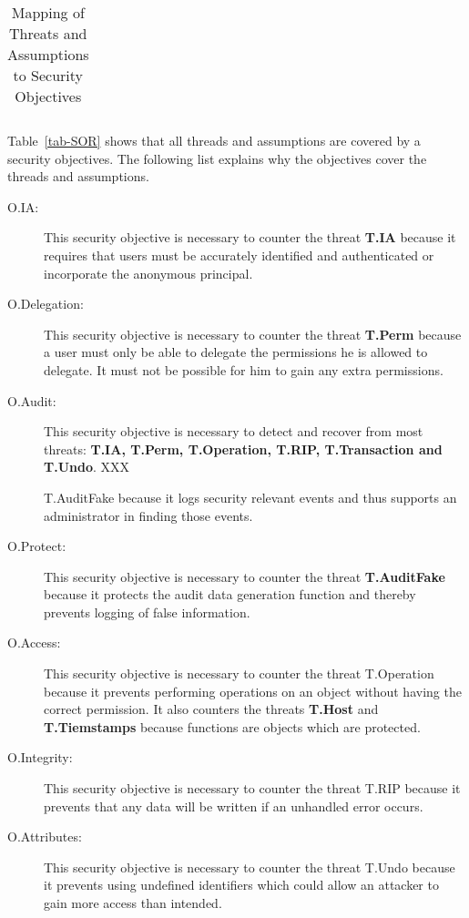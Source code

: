 \documentclass[12pt,english]{scrbook}
\begin{document}
\begin{table}
\begin{tabular}{rRRRRRRRRRRRRRRRRRR}
\bottomrule
  \end{tabular}
  \label{tab-SOR}
  \caption{Mapping of Threats and Assumptions to Security Objectives}
\end{table}

Table~\vref{tab-SOR} shows that all threads and assumptions are covered
by a security objectives. The following list explains why the objectives cover
the threads and assumptions.

\begin{description}
  
  \item[O.IA:] This security objective is necessary to counter the threat
  \textbf{T.IA} because it requires that users must be accurately identified
  and authenticated or incorporate the anonymous principal.

  \item[O.Delegation:] This security objective is necessary to counter the
  threat \textbf{T.Perm} because a user must only be able to delegate the permissions
  he is allowed to delegate. It must not be possible for him to gain any extra
  permissions.
  
  \item[O.Audit:] This security objective is necessary to detect and recover
  from most threats: \textbf{T.IA, T.Perm, T.Operation, T.RIP, T.Transaction
    and T.Undo}. XXX
  
  T.AuditFake because it logs security relevant events and thus supports an
  administrator in finding those events.

  \item[O.Protect:] This security objective is necessary to counter the threat
  \textbf{T.AuditFake} because it protects the audit data generation function
  and thereby prevents logging of false information.
  
  \item[O.Access:] This security objective is necessary to counter the threat
  T.Operation because it prevents performing operations on an object without
  having the correct permission. It also counters the threats \textbf{T.Host}
  and \textbf{T.Tiemstamps} because functions are objects which are protected.

  \item[O.Integrity:] This security objective is necessary to counter the
  threat T.RIP because it prevents that any data will be written if an 
  unhandled error occurs.
  
  \item[O.Attributes:] This security objective is necessary to counter the
  threat T.Undo because it prevents using undefined identifiers which could
  allow an attacker to gain more access than intended.


\end{description}
\end{document}

